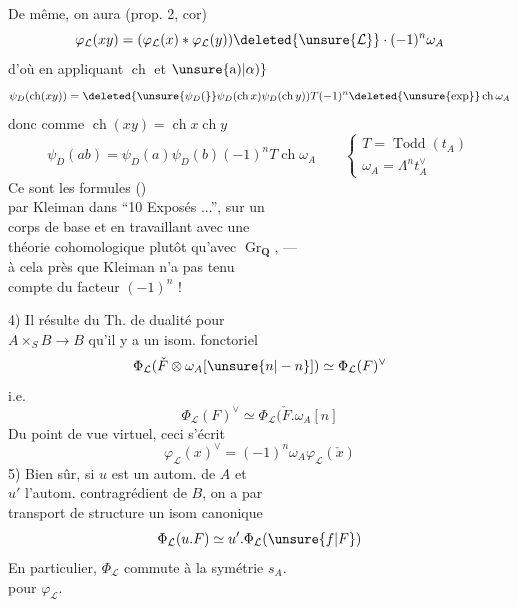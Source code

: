 De même, on aura (prop. 2, cor)
\[
\varphi_{\mathcal L}(xy)=(\varphi_{\mathcal L}(x)*\varphi_{\mathcal L}(y))\deleted{\unsure{\mathcal L}}\cdot(-1)^n\omega_A
\]
d'où en appliquant $\operatorname{ch}$ et $\unsure{\text{a)}|\alpha)}$
\[
\psi_D(\operatorname{ch}(xy))=\deleted{\unsure{\psi_D(}}\psi_D(\operatorname{ch}x)\psi_D(\operatorname{ch}y))T(-1)^n\deleted{\unsure{\exp}}\operatorname{ch}\omega_A
\]
donc comme $\operatorname{ch}(xy)=\operatorname{ch}x\operatorname{ch}y$
\[
\boxed{\psi_D(ab)=\psi_D(a)\psi_D(b)(-1)^nT\operatorname{ch}\omega_A}
\qquad\begin{cases}T=\operatorname{Todd}(t_A)\\\omega_A=\Lambda^n t_A^\vee\end{cases}
\]
Ce sont les formules  ()\\
par Kleiman dans ``10 Exposés ...'', sur un\\
corps de base et en travaillant avec une\\
théorie cohomologique plutôt qu'avec $\operatorname{Gr}_{\mathbf Q}$, ---\\
à cela près que Kleiman n'a pas tenu\\
compte du facteur $(-1)^n$ !

4) Il résulte du Th. de dualité pour\\
$A\times_S B\longrightarrow B$ qu'il y a un isom. fonctoriel
\[
\Phi_{\mathcal L}(\check F\otimes\omega_A[\unsure{n|-n}])\simeq\Phi_{\mathcal L}(F)^\vee
\]
i.e.
\[
\boxed{\Phi_{\mathcal L}(F)^\vee\simeq\Phi_{\mathcal L}(\check F.\omega_A[n]}
\]
Du point de vue virtuel, ceci s'écrit
\[
\varphi_{\mathcal L}(x)^\vee=(-1)^n\omega_A\varphi_{\mathcal L}(\check x)
\]
5) Bien sûr, si $u$ est un autom. de $A$ et\\
$u'$ l'autom. contragrédient de $B$, on a par\\
transport de structure un isom canonique
\[
\Phi_{\mathcal L}(u.F)\simeq u'.\Phi_{\mathcal L}(\unsure{f|F})
\]
En particulier, $\Phi_{\mathcal L}$ commute à la symétrie $s_A$. \\
 pour $\varphi_{\mathcal L}$.
